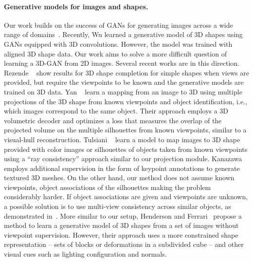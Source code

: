 \paragraph{Generative models for images and shapes.} Our work builds
on the success of GANs for generating images across a wide range of
domains~\cite{goodfellow2014generative}. 
Recently, Wu \etal \cite{wu2016learning} learned a generative model of
3D shapes using GANs equipped with 3D convolutions.
However, the model was trained with aligned 3D shape data.
Our work aims to solve a more difficult question of learning a 3D-GAN
from 2D images. 
Several recent works are in this direction. 
Rezende \etal~\cite{rezende2016unsupervised} show results for 3D
shape completion for simple shapes when views are provided, 
but require the viewpoints to be known and the generative models are
trained on 3D data. 
Yan \etal~\cite{yan2016perspective} learn a mapping from an image
to 3D using multiple 
projections of the 3D shape from known viewpoints and object
identification, i.e., which images correspond to the same object. 
Their approach employs a 3D volumetric decoder and optimizes a loss that measures the 
overlap of the projected volume on the multiple silhouettes from known viewpoints, 
similar to a visual-hull reconstruction. 
Tulsiani \etal~\cite{drcTulsiani17} learn a model to map images to 3D
shape provided with color images or silhouettes of objects taken from
known viewpoints using a ``ray consistency'' approach similar to our
projection module.
Kanazawa \etal~\cite{cmrKanazawa18} employs additional supervision in the form of
keypoint annotations to generate textured 3D meshes.
On the other hand, our method does not assume known viewpoints,
object associations of the silhouettes making the problem considerably
harder.
If object associations are given and viewpoints are unknown, a possible
solution is to use multi-view consistency across similar objects, as demonstrated in~\cite{mvcTulsiani18}.
More similar to our setup, Henderson and Ferrari~\cite{henderson18} propose a method to learn
a generative model of 3D shapes from a set of images without viewpoint supervision.
However, their approach uses a more constrained shape representation -- sets of blocks or deformations
in a subdivided cube -- and other visual cues such as lighting configuration and normals.


